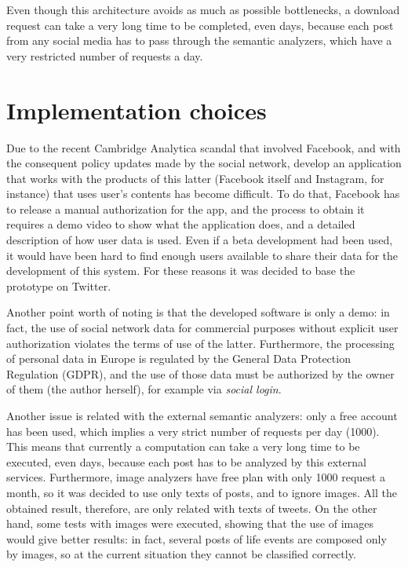 Even though this architecture avoids as much as possible bottlenecks, a download request can take a very long time to be completed, even days, because each post from any social media has to pass through the semantic analyzers, which have a very restricted number of requests a day.

\section{Implementation choices}
\label{sec:choices}
Due to the recent Cambridge Analytica scandal that involved Facebook, and with the consequent policy updates made by the social network, develop an application that works with the products of this latter (Facebook itself and Instagram, for instance) that uses user's contents has become difficult. To do that, Facebook has to release a manual authorization for the app, and the process to obtain it requires a demo video to show what the application does, and a detailed description of how user data is used. Even if a beta development had been used, it would have been hard to find enough users available to share their data for the development of this system. For these reasons it was decided to base the prototype on Twitter.

Another point worth of noting is that the developed software is only a demo: in fact, the use of social network data for commercial purposes without explicit user authorization violates the terms of use of the latter. Furthermore, the processing of personal data in Europe is regulated by the General Data Protection Regulation (GDPR), and the use of those data must be authorized by the owner of them (the author herself), for example via \emph{social login}.

Another issue is related with the external semantic analyzers: only a free account has been used, which implies a very strict number of requests per day (1000). This means that currently a computation can take a very long time to be executed, even days, because each post has to be analyzed by this external services. Furthermore, image analyzers have free plan with only 1000 request a month, so it was decided to use only texts of posts, and to ignore images. All the obtained result, therefore, are only related with texts of tweets. On the other hand, some tests with images were executed, showing that the use of images would give better results: in fact, several posts of life events are composed only by images, so at the current situation they cannot be classified correctly.


